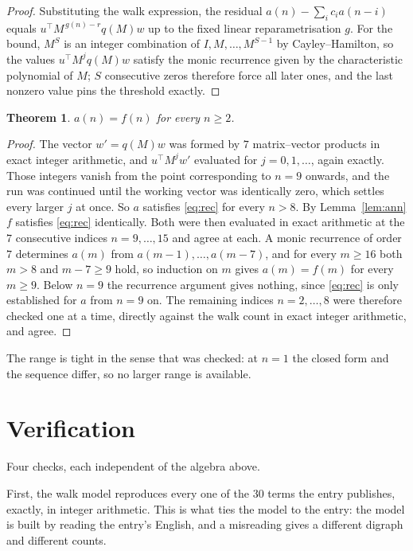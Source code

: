 \documentclass[11pt,a4paper]{article}
\theoremstyle{plain}
\newtheorem{theorem}{Theorem}
\theoremstyle{definition}
\begin{document}
\begin{proof}
Substituting the walk expression, the residual $a(n)-\sum_ic_ia(n-i)$ equals
$u^{\!\top}M^{\,g(n)-r}q(M)w$ up to the fixed linear reparametrisation $g$. For the bound,
$M^{S}$ is an integer combination of $I,M,\dots,M^{S-1}$ by Cayley--Hamilton, so the values
$u^{\!\top}M^{j}q(M)w$ satisfy the monic recurrence given by the characteristic polynomial of
$M$; $S$ consecutive zeros therefore force all later ones, and the last nonzero value pins the
threshold exactly.
\end{proof}

\begin{theorem}
$a(n)=f(n)$ for every $n\ge2$.
\end{theorem}

\begin{proof}
The vector $w'=q(M)w$ was formed by $7$ matrix--vector products in exact integer
arithmetic, and $u^{\!\top}M^{j}w'$ evaluated for $j=0,1,\dots$, again exactly. Those integers
vanish from the point corresponding to $n=9$ onwards, and the run was continued until the
working vector was identically zero, which settles every larger $j$ at once. So $a$ satisfies
\eqref{eq:rec} for every $n>8$. By Lemma~\ref{lem:ann} $f$ satisfies \eqref{eq:rec}
identically. Both were then evaluated in exact arithmetic at the $7$ consecutive indices
$n=9,\dots,15$ and agree at each. A monic recurrence of order $7$
determines $a(m)$ from $a(m-1),\dots,a(m-7)$, and for every $m\ge16$ both
$m>8$ and $m-7\ge9$ hold, so induction on $m$ gives $a(m)=f(m)$ for every
$m\ge9$.
Below $n=9$ the recurrence argument gives nothing, since \eqref{eq:rec} is only
established for $a$ from $n=9$ on. The remaining indices $n=2,\dots,8$ were
therefore checked one at a time, directly against the walk count in exact integer arithmetic,
and agree.
\end{proof}

The range is tight in the sense that was checked: at $n=1$ the closed form and the sequence differ, so no larger range is available.

\section{Verification}

Four checks, each independent of the algebra above.

First, the walk model reproduces every one of the $30$ terms the entry publishes,
exactly, in integer arithmetic. This is what ties the model to the entry: the model is built
by reading the entry's English, and a misreading gives a different digraph and different
counts.
\end{document}
